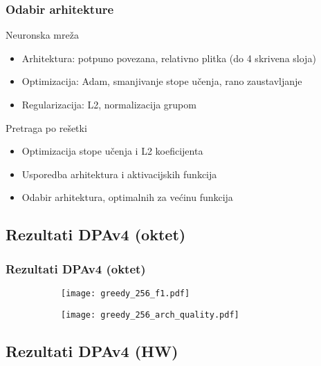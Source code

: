 \documentclass{beamer}
\begin{document}
\begin{frame}
\frametitle{Odabir arhitekture}

Neuronska mreža

\begin{itemize}
\item Arhitektura: potpuno povezana, relativno plitka (do 4 skrivena sloja)
\item Optimizacija: Adam, smanjivanje stope učenja, rano zaustavljanje
\item Regularizacija: L2, normalizacija grupom
\end{itemize}

Pretraga po rešetki

\begin{itemize}
\item Optimizacija stope učenja i L2 koeficijenta
\item Usporedba arhitektura i aktivacijskih funkcija
\item Odabir arhitektura, optimalnih za većinu funkcija
\end{itemize}
\end{frame}

\subsection{Rezultati DPAv4 (oktet)}

\begin{frame}
\frametitle{Rezultati DPAv4 (oktet)}

\begin{figure}
\centering
\begin{subfigure}{.48\textwidth}
  \centering
  \texttt{[image: greedy\_256\_f1.pdf]}
\end{subfigure}
\begin{subfigure}{.5\textwidth}
  \centering
  \texttt{[image: greedy\_256\_arch\_quality.pdf]}
\end{subfigure}
\end{figure}

\end{frame}

\subsection{Rezultati DPAv4 (HW)}
\end{document}
